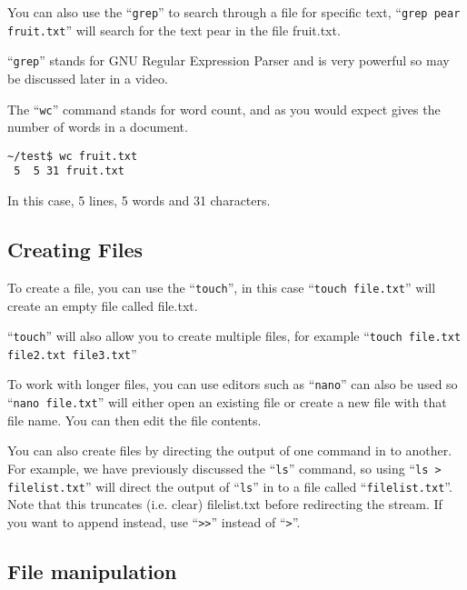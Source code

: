 \documentclass{extbook}
\begin{document}
You can also use the ``\verb|grep|'' to search through a file for specific text,
``\verb|grep pear fruit.txt|'' will search for the text pear in the file fruit.txt.

``\verb|grep|'' stands for GNU Regular Expression Parser and is very powerful so may be discussed later in a video.

The ``\verb|wc|'' command stands for word count, and as you would expect gives the number of words in a document.

\begin{verbatim}
~/test$ wc fruit.txt
 5  5 31 fruit.txt
\end{verbatim}

In this case, 5 lines, 5 words and 31 characters.



\subsection{Creating Files}

To create a file, you can use the ``\verb|touch|'', in this case ``\verb|touch file.txt|'' will create an empty file called file.txt.

``\verb|touch|'' will also allow you to create multiple files, for example ``\verb|touch file.txt file2.txt file3.txt|''

To work with longer files, you can use editors such as ``\verb|nano|'' can also be used so ``\verb|nano file.txt|'' will either open an existing file or create a new file with that file name. You can then edit the file contents.

You can also create files by directing the output of one command in to another. For example, we have previously discussed the ``\verb|ls|'' command, so using ``\verb|ls > filelist.txt|'' will direct the output of ``\verb|ls|'' in to a file called ``\verb|filelist.txt|''. Note that this truncates (i.e. clear) filelist.txt before redirecting the stream. If you want to append instead, use ``\verb|>>|'' instead of ``\verb|>|''.


\subsection{File manipulation}
\end{document}
